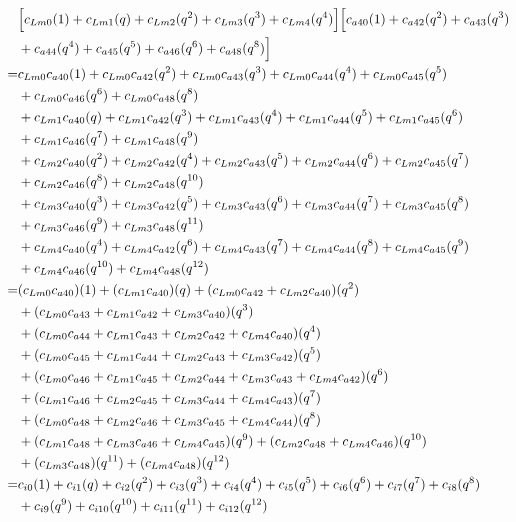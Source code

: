 \documentclass[12pt]{article}
\begin{document}
\begin{align}
    &\Bigl[ c_{Lm0}(1) + c_{Lm1}(q)  + c_{Lm2}(q^2) + c_{Lm3}(q^3) + c_{Lm4}(q^4)  \Bigr]\Bigl[ c_{a40}(1) + c_{a42}(q^2) + c_{a43}(q^3) \nonumber\\
    &+ c_{a44}(q^4) + c_{a45}(q^5) + c_{a46}(q^6) + c_{a48}(q^8)  \Bigr]\\
    =& c_{Lm0}c_{a40}(1) + c_{Lm0}c_{a42}(q^2) + c_{Lm0}c_{a43}(q^3) + c_{Lm0}c_{a44}(q^4)  + c_{Lm0}c_{a45}(q^5) \nonumber\\
    &+ c_{Lm0}c_{a46}(q^6) + c_{Lm0}c_{a48}(q^8)  \nonumber\\
    &+  c_{Lm1}c_{a40}(q) + c_{Lm1}c_{a42}(q^3) + c_{Lm1}c_{a43}(q^4) + c_{Lm1}c_{a44}(q^5) + c_{Lm1}c_{a45}(q^6) \nonumber\\
    &+ c_{Lm1}c_{a46}(q^7) + c_{Lm1}c_{a48}(q^9)  \nonumber\\
    &+  c_{Lm2}c_{a40}(q^2) + c_{Lm2}c_{a42}(q^4) + c_{Lm2}c_{a43}(q^5) + c_{Lm2}c_{a44}(q^6) + c_{Lm2}c_{a45}(q^7) \nonumber\\
    &+ c_{Lm2}c_{a46}(q^8) + c_{Lm2}c_{a48}(q^{10})  \nonumber\\
    &+  c_{Lm3}c_{a40}(q^3) + c_{Lm3}c_{a42}(q^5) + c_{Lm3}c_{a43}(q^6) + c_{Lm3}c_{a44}(q^7) + c_{Lm3}c_{a45}(q^8) \nonumber\\
    &+ c_{Lm3}c_{a46}(q^9) + c_{Lm3}c_{a48}(q^{11})  \nonumber\\
    &+  c_{Lm4}c_{a40}(q^4) + c_{Lm4}c_{a42}(q^6) + c_{Lm4}c_{a43}(q^7) + c_{Lm4}c_{a44}(q^8) + c_{Lm4}c_{a45}(q^9) \nonumber\\
    &+ c_{Lm4}c_{a46}(q^{10}) + c_{Lm4}c_{a48}(q^{12})  \\
    =& (c_{Lm0}c_{a40})(1) + (c_{Lm1}c_{a40})(q) + ( c_{Lm0}c_{a42} +  c_{Lm2}c_{a40})(q^2) \nonumber\\
    &+ (c_{Lm0}c_{a43} + c_{Lm1}c_{a42} + c_{Lm3}c_{a40})(q^3) \nonumber\\
    &+ (c_{Lm0}c_{a44} + c_{Lm1}c_{a43} +  c_{Lm2}c_{a42} + c_{Lm4}c_{a40})(q^4) \nonumber\\
    &+ (c_{Lm0}c_{a45} + c_{Lm1}c_{a44} + c_{Lm2}c_{a43} + c_{Lm3}c_{a42} )(q^5) \nonumber\\
    &+ (c_{Lm0}c_{a46} + c_{Lm1}c_{a45} + c_{Lm2}c_{a44} + c_{Lm3}c_{a43} + c_{Lm4}c_{a42}  )(q^6) \nonumber\\
    &+ (c_{Lm1}c_{a46} + c_{Lm2}c_{a45} + c_{Lm3}c_{a44} + c_{Lm4}c_{a43})(q^7) \nonumber\\
    &+ (c_{Lm0}c_{a48} + c_{Lm2}c_{a46} + c_{Lm3}c_{a45} + c_{Lm4}c_{a44})(q^8) \nonumber\\
    &+ (c_{Lm1}c_{a48} + c_{Lm3}c_{a46} + c_{Lm4}c_{a45})(q^9) + (c_{Lm2}c_{a48} + c_{Lm4}c_{a46})(q^{10}) \nonumber\\
    &+ (c_{Lm3}c_{a48})(q^{11}) + (c_{Lm4}c_{a48})(q^{12}) \\
    =& c_{i0}(1) + c_{i1}(q) + c_{i2}(q^2) + c_{i3}(q^3) + c_{i4}(q^4) + c_{i5}(q^5) + c_{i6}(q^6) + c_{i7}(q^7) + c_{i8}(q^8) \nonumber\\
    &+ c_{i9}(q^9) + c_{i10}(q^{10}) + c_{i11}(q^{11}) + c_{i12}(q^{12})
\end{align}
\end{document}
